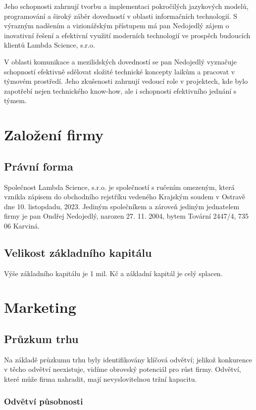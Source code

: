 \documentclass[a4paper,12pt]{report}
\begin{document}
Jeho schopnosti zahrnují tvorbu a implementaci pokročilých jazykových modelů, programování a široký záběr dovedností v oblasti
 informačních technologií. S výrazným nadšením a vizionářským přístupem má pan Nedojedlý zájem o inovativní řešení a efektivní
  využití moderních technologií ve prospěch budoucích klientů Lambda Science, s.r.o.

  V oblasti komunikace a mezilidských dovedností se pan Nedojedlý vyznačuje schopností efektivně sdělovat složité technické koncepty 
  laikům a pracovat v týmovém prostředí. Jeho zkušenosti zahrnují vedoucí role v projektech, kde bylo zapotřebí nejen technického
   know-how, ale i schopnosti efektivního jednání s týmem.

\section{Založení firmy}
\subsection{Právní forma}

Společnost Lambda Science, s.r.o. je společností s ručením omezeným, která vznikla zápisem 
do obchodního rejstříku vedeného Krajským soudem v Ostravě dne 10. listopdadu, 2023.
Jediným společníkem a zároveň jediným jednatelem firmy je pan Ondřej Nedojedlý, narozen 27. 11. 2004, bytem Tovární 2447/4, 735 06 Karviná.

\subsection{Velikost základního kapitálu}
Výše základního kapitálu je 1 mil. Kč a základní kapitál je celý splacen.

\newpage

\section{Marketing}

\subsection{Průzkum trhu}

Na základě průzkumu trhu byly identifikovány klíčová odvětví; jelikož konkurence v těcho odvětví neexistuje,
vidíme obrovský potenciál pro růst firmy. Odvětví, které může firma nahradit, mají nevyslovitelnou tržní kapacitu.

\subsubsection{Odvětví působnosti}
\end{document}
